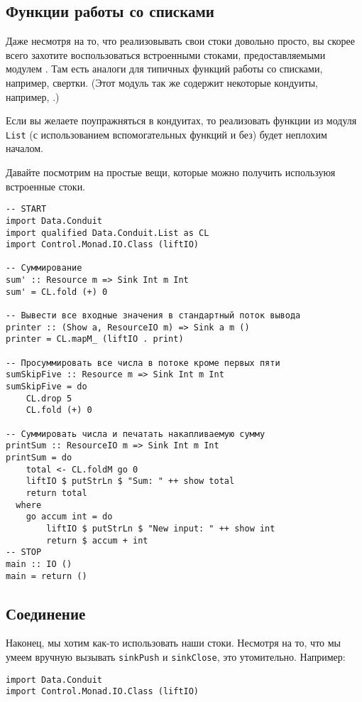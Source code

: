 {\subsection{Функции работы со списками}
Даже несмотря на то, что реализовывать свои стоки довольно просто, вы скорее всего захотите воспользоваться встроенными стоками, предоставляемыми модулем
. Там есть аналоги для типичных функций работы со
списками, например, свертки. (Этот модуль так же содержит некоторые кондуиты,
например, 
.)

Если вы желаете поупражняться в кондуитах, то реализовать функции из модуля 
\lstinline'List' (с использованием вспомогательных функций и без) будет неплохим началом.

Давайте посмотрим на простые вещи, которые можно получить используюя встроенные стоки.
\begin{lstlisting}
-- START
import Data.Conduit
import qualified Data.Conduit.List as CL
import Control.Monad.IO.Class (liftIO)

-- Суммирование
sum' :: Resource m => Sink Int m Int
sum' = CL.fold (+) 0

-- Вывести все входные значения в стандартный поток вывода
printer :: (Show a, ResourceIO m) => Sink a m ()
printer = CL.mapM_ (liftIO . print)

-- Просуммировать все числа в потоке кроме первых пяти
sumSkipFive :: Resource m => Sink Int m Int
sumSkipFive = do
    CL.drop 5
    CL.fold (+) 0

-- Суммировать числа и печатать накапливаемую сумму
printSum :: ResourceIO m => Sink Int m Int
printSum = do
    total <- CL.foldM go 0
    liftIO $ putStrLn $ "Sum: " ++ show total
    return total
  where
    go accum int = do
        liftIO $ putStrLn $ "New input: " ++ show int
        return $ accum + int
-- STOP
main :: IO ()
main = return ()
\end{lstlisting}

\subsection{Соединение}
Наконец, мы хотим как-то использовать наши стоки. Несмотря на то, что мы умеем вручную вызывать
\verb*|sinkPush| и \verb*|sinkClose|, это утомительно. Например:
\begin{lstlisting}
import Data.Conduit
import Control.Monad.IO.Class (liftIO)


\end{lstlisting}}
